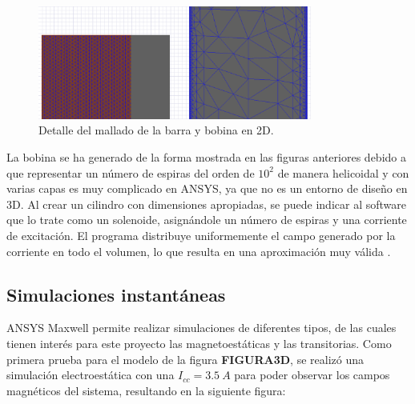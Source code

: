\begin{itemize}
\begin{figure}[H]
        \label{fig:BarGeomMesh} %
    \end{figure}
    \begin{figure}[H]
        \centering
        \includegraphics[width=9cm]{FigurasMemoria/BarMeshDetail.png}
        \caption{Detalle del mallado de la barra y bobina en 2D.}
        \label{fig:GeomMeshDetail} %
    \end{figure}
\end{itemize}

La bobina se ha generado de la forma mostrada en las figuras anteriores debido a que representar un número de espiras del orden de \(10^2\) de manera helicoidal y con varias capas es muy complicado en ANSYS, ya que no es un entorno de diseño en 3D. Al crear un cilindro con dimensiones apropiadas, se puede indicar al software que lo trate como un solenoide, asignándole un número de espiras y una corriente de excitación. El programa distribuye uniformemente el campo generado por la corriente en todo el volumen, lo que resulta en una aproximación muy válida \citep[p. 13]{ansoft2012maxwell}.

\subsection{Simulaciones instantáneas}
ANSYS Maxwell permite realizar simulaciones de diferentes tipos, de las cuales tienen interés para este proyecto las magnetoestáticas y las transitorias. Como primera prueba para el modelo de la figura \textbf{FIGURA3D}, se realizó una simulación electroestática con una \(I_{cc}=3.5~A\) para poder observar los campos magnéticos del sistema, resultando en la siguiente figura:

